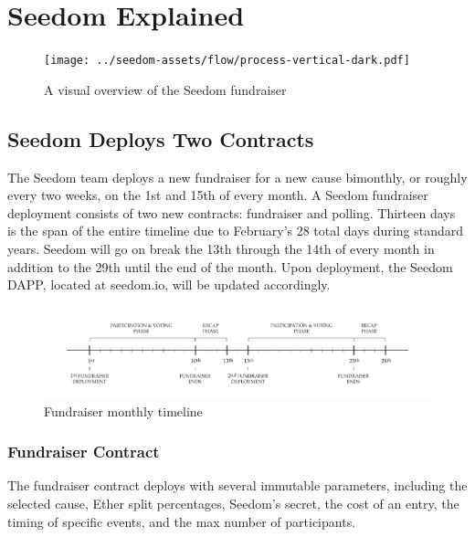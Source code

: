 \documentclass[11pt]{article}
\begin{document}
\section{Seedom Explained}

\begin{figure}[H]
\begin{center}
\texttt{[image: ../seedom-assets/flow/process-vertical-dark.pdf]}
\caption{A visual overview of the Seedom fundraiser}
\end{center}
\end{figure}

\subsection{Seedom Deploys Two Contracts}

The Seedom team deploys a new fundraiser for a new cause bimonthly, or roughly every two weeks, on the 1st and 15th of every month. A Seedom fundraiser deployment consists of two new contracts: fundraiser and polling. Thirteen days is the span of the entire timeline due to February's 28 total days during standard years. Seedom will go on break the 13th through the 14th of every month in addition to the 29th until the end of the month. Upon deployment, the Seedom DAPP, located at seedom.io, will be updated accordingly.

\begin{figure}[H]
\begin{center}
\includegraphics[width=1.0\textwidth]{./graphics/fundraiser-monthly-timeline.pdf}
\caption{Fundraiser monthly timeline}
\label{figure:fundraiserMonthlyTimeline}
\end{center}
\end{figure}

\subsubsection{Fundraiser Contract}

The fundraiser contract deploys with several immutable parameters, including the selected cause, Ether split percentages, Seedom's secret, the cost of an entry, the timing of specific events, and the max number of participants.
\end{document}
